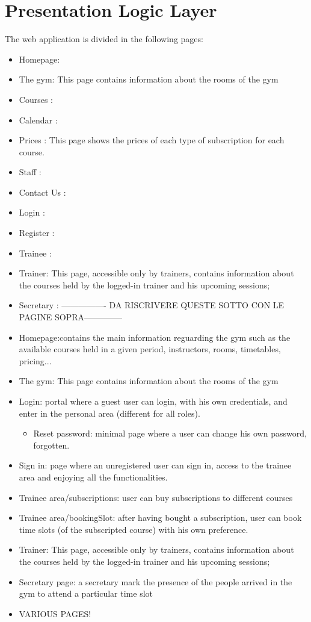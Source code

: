 \section{Presentation Logic Layer}


The web application is divided in the following pages:
\begin{itemize}
	\item Homepage: 
	\item The gym: This page contains information about the rooms of the gym
	\item Courses :
	\item Calendar :
	\item Prices : This page shows the prices of each type of subscription for each course.
	\item Staff :
	\item Contact Us :
	\item Login :
	\item Register :
	\item Trainee :
	\item Trainer: This page, accessible only by trainers, contains information about the courses held by the logged-in trainer and his upcoming sessions;
	\item Secretary :
	---------------- DA RISCRIVERE QUESTE SOTTO CON LE PAGINE SOPRA--------------
	\item Homepage:contains the main information reguarding the gym such as the available courses held in a given period, instructors, rooms, timetables, pricing...
	\item The gym: This page contains information about the rooms of the gym
	\item Login: portal where a guest user can login, with his own credentials, and enter in the personal area (different for all roles).
	\begin{itemize}
		\item Reset password: minimal page where a user can change his own password, forgotten.
	\end{itemize}
	\item Sign in: page where an unregistered user can sign in, access to the trainee area and enjoying all the functionalities.
	\item Trainee area/subscriptions: user can buy subscriptions to different courses
	\item Trainee area/bookingSlot: after having bought a subscription, user can book time slots (of the subscripted course) with his own preference.
	\item Trainer: This page, accessible only by trainers, contains information about the courses held by the logged-in trainer and his upcoming sessions;
	\item Secretary page: a secretary mark the presence of the people arrived in the gym to attend a particular time slot
	
	\item VARIOUS PAGES!
\end{itemize}

